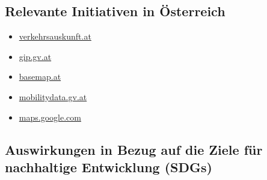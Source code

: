 \documentclass[
]{book}
\providecommand{\tightlist}{%
  \setlength{\itemsep}{0pt}\setlength{\parskip}{0pt}}
\begin{document}
\hypertarget{relevante-initiativen-in-uxf6sterreich-21}{%
\subsection*{Relevante Initiativen in Österreich}\label{relevante-initiativen-in-uxf6sterreich-21}}

\begin{itemize}
\tightlist
\item
  \href{https://www.verkehrsauskunft.at/}{verkehrsauskunft.at}
\item
  \href{https://www.gip.gv.at/}{gip.gv.at}
\item
  \href{https://www.basemap.at/}{basemap.at}
\item
  \href{https://www.mobilitydata.gv.at/}{mobilitydata.gv.at}
\item
  \href{http://maps.google.com/landing/transit/cities/index.html\#Europe}{maps.google.com}
\end{itemize}

\hypertarget{auswirkungen-in-bezug-auf-die-ziele-fuxfcr-nachhaltige-entwicklung-sdgs-21}{%
\subsection*{Auswirkungen in Bezug auf die Ziele für nachhaltige Entwicklung (SDGs)}\label{auswirkungen-in-bezug-auf-die-ziele-fuxfcr-nachhaltige-entwicklung-sdgs-21}}
\end{document}
